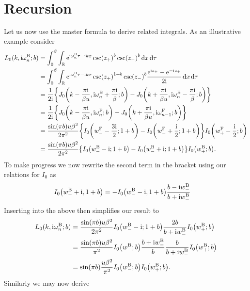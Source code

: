 \documentclass[english, parskip=full]{scrartcl}
\begin{document}
\section{Recursion}
Let us now use the master formula to derive related integrals.
As an illustrative example consider
\begin{align}
L_0(k,\i\omega_n^\B;b) &= \intx{0}{\beta}{\intr{\powe{\i\omega_n^\B\tau - \i kx} \csc(z_+)^{b} \csc (z_-)^b}{x} }{\tau}\\
&= \intx{0}{\beta}{\intr{\powe{\i\omega_n^\B\tau - \i kx} \csc(z_+)^{1+b} \csc (z_-)^b \frac{\powe{\i z_+} - \powe{-\i z_+}}{2\i} }{x} }{\tau}\\
&= \frac{1}{2\i} \klc*{J_0\kla*{k - \frac{\pi\i}{\beta u}, \i\omega_n^\B + \frac{\pi\i}{\beta}; b} - J_0\kla*{k + \frac{\pi\i}{\beta u}, \i\omega_n^\B - \frac{\pi\i}{\beta}; b}}\\
&= \frac{1}{2\i} \klc*{J_0\kla*{k - \frac{\pi\i}{\beta u}, \i\omega_n^\F; b} - J_0\kla*{k + \frac{\pi\i}{\beta u}, \i\omega_{n-1}^\F; b}}\\
&= \frac{\sin(\pi b) u\beta^2}{2\pi^2} \klc*{I_0\kla*{w_-^\F - \frac{3\i}{2}; 1+b} - I_0\kla*{w_-^\F + \frac{\i}{2}; 1+b}} I_0\kla*{w_+^\F - \frac{\i}{2}; b}\\
&= \frac{\sin(\pi b) u\beta^2}{2\pi^2} \klc*{I_0\kla*{w_-^\B - \i; 1+b} - I_0\kla*{w_-^\B + \i; 1+b}} I_0\kla*{w_+^\B; b}.
\end{align}
To make progress we now rewrite the second term in the bracket using our relations for $I_0$ as
\begin{align}
I_0\kla*{w_-^\B + \i, 1+b} &= -I_0\kla*{w_-^\B -\i, 1+b} \frac{b - \i w_-^\B}{b + \i w_-^\B}
\end{align}
Inserting into the above then simplifies our result to
\begin{align}
L_0(k,\i\omega_n^\B;b) &= \frac{\sin(\pi b) u\beta^2}{2\pi^2} I_0\kla*{w_-^\B - \i; 1+b} \frac{2b}{b+\i w_-^\B} I_0\kla*{w_+^\B; b}\\
&= \frac{\sin(\pi b) u\beta^2}{\pi^2} I_0\kla*{w_-^\B; b} \frac{b + \i w_-^\B}{b} \frac{b}{b+\i w_-^\B} I_0\kla*{w_+^\B; b}\\
&= \sin(\pi b) \frac{u\beta^2}{\pi^2} I_0\kla*{w_-^\B; b} I_0\kla*{w_+^\B; b}.
\end{align}
Similarly we may now derive
\end{document}
